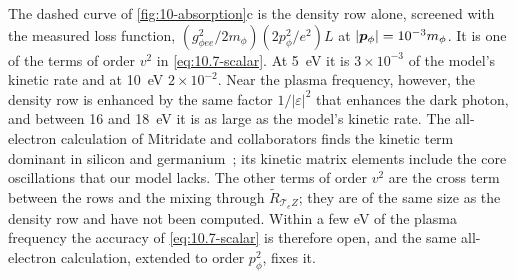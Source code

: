 The dashed curve of \cref{fig:10-absorption}c is the density row alone, screened with the measured loss function, $(g_{\phi ee}^2/2m_\phi)(2p_\phi^2/e^2)L$ at $|\bm{p}_\phi| = 10^{-3}m_\phi$. It is one of the terms of order $v^2$ in \cref{eq:10.7-scalar}. At \SI{5}{eV} it is $3\times10^{-3}$ of the model's kinetic rate and at \SI{10}{eV} $2\times10^{-2}$. Near the plasma frequency, however, the density row is enhanced by the same factor $1/|\varepsilon|^2$ that enhances the dark photon, and between 16 and \SI{18}{eV} it is as large as the model's kinetic rate. The all-electron calculation of Mitridate and collaborators finds the kinetic term dominant in silicon and germanium~\cite[Fig.~1 and Sect.~IV]{mitridate2021dark}; its kinetic matrix elements include the core oscillations that our model lacks. The other terms of order $v^2$ are the cross term between the rows and the mixing through $\tilde R_{\mathcal{T}_eZ}$; they are of the same size as the density row and have not been computed. Within a few eV of the plasma frequency the accuracy of \cref{eq:10.7-scalar} is therefore open, and the same all-electron calculation, extended to order $p_\phi^2$, fixes it.
